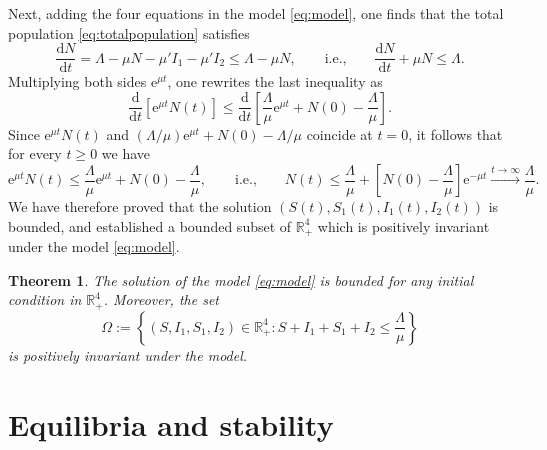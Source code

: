 \documentclass[11pt,reqno]{amsart}
\newtheorem{theorem}{Theorem}
\newcommand{\e}{\text{e}}
\newcommand{\de}{\text{d}}
\begin{document}
Next, adding the four equations in the model \eqref{eq:model}, one finds that the total population \eqref{eq:totalpopulation} satisfies
$$\frac{\de N}{\de t}=\Lambda-\mu N -\mu' I_1 -\mu' I_2\leqslant \Lambda - \mu N,\qquad\text{i.e.,}\qquad \frac{\de N}{\de t}+\mu N\leqslant \Lambda.$$
Multiplying both sides $\e^{\mu t}$, one rewrites the last inequality as
$$\frac{\de }{\de t}\left[\e^{\mu t} N(t)\right]\leqslant \frac{\de }{\de t}\left[\frac{\Lambda}{\mu}\e^{\mu t}+N(0)-\frac{\Lambda}{\mu}\right].$$
Since $\e^{\mu t} N(t)$ and $(\Lambda/\mu)\e^{\mu t}+N(0)-\Lambda/\mu$ coincide at $t=0$, it follows that for every $t\geqslant 0$ we have
$$\e^{\mu t} N(t)\leqslant \frac{\Lambda}{\mu}\e^{\mu t}+N(0)-\frac{\Lambda}{\mu},\qquad\text{i.e.,}\qquad N(t)\leqslant \frac{\Lambda}{\mu}+\left[N(0)-\frac{\Lambda}{\mu}\right]\e^{-\mu t}\xrightarrow{t\to\infty}\frac{\Lambda}{\mu}.$$
We have therefore proved that the solution $\left(S(t),S_1(t),I_1(t),I_2(t)\right)$ is bounded, and established a bounded subset of $\mathbb{R}_+^4$ which is positively invariant under the model \eqref{eq:model}.\smallskip

\begin{theorem}\label{thm:domain}
The solution of the model \eqref{eq:model} is bounded for any initial condition in $\mathbb{R}_+^4$. Moreover, the set
$$\Omega:=\left\{\left(S,I_1,S_1,I_2\right)\in\mathbb{R}_+^4: S+I_1+S_1+I_2\leqslant\frac{\Lambda}{\mu}\right\}$$
is positively invariant under the model.
\end{theorem}\smallskip



\section{Equilibria and stability}\label{sec:equilibria}
\end{document}
